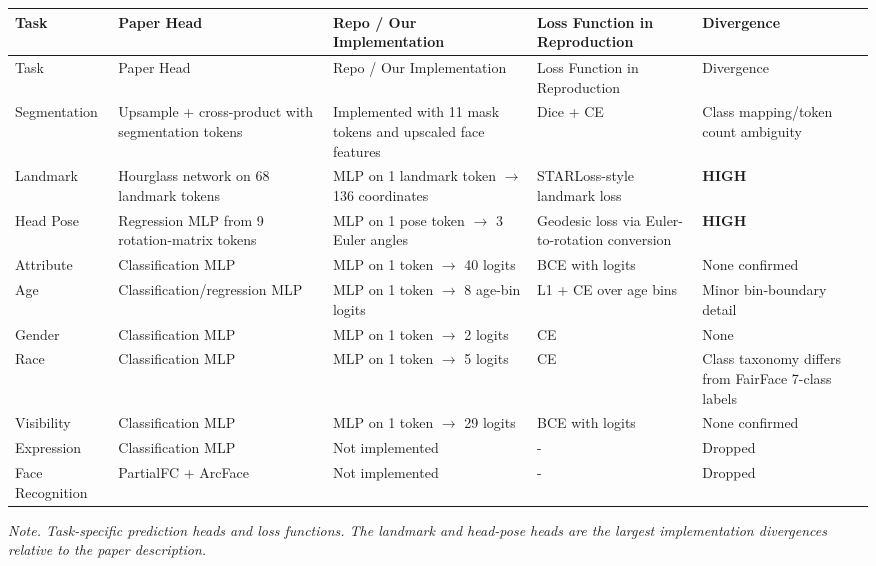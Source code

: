 \documentclass[11pt]{article}
\begin{document}
\begingroup
\scriptsize
\setlength{\tabcolsep}{3pt}
\begin{longtable}{@{}>{\RaggedRight\arraybackslash}p{}>{\RaggedRight\arraybackslash}p{}>{\RaggedRight\arraybackslash}p{}>{\RaggedRight\arraybackslash}p{}>{\RaggedRight\arraybackslash}p{}@{}}
\toprule
Task & Paper Head & Repo / Our Implementation & Loss Function in Reproduction & Divergence \\
\midrule
\endfirsthead
\toprule
Task & Paper Head & Repo / Our Implementation & Loss Function in Reproduction & Divergence \\
\midrule
\endhead
Segmentation & Upsample + cross-product with segmentation tokens & Implemented with 11 mask tokens and upscaled face features & Dice + CE & Class mapping/token count ambiguity \\
Landmark & Hourglass network on 68 landmark tokens & MLP on 1 landmark token $\rightarrow$ 136 coordinates & STARLoss-style landmark loss & \textbf{HIGH} \\
Head Pose & Regression MLP from 9 rotation-matrix tokens & MLP on 1 pose token $\rightarrow$ 3 Euler angles & Geodesic loss via Euler-to-rotation conversion & \textbf{HIGH} \\
Attribute & Classification MLP & MLP on 1 token $\rightarrow$ 40 logits & BCE with logits & None confirmed \\
Age & Classification/regression MLP & MLP on 1 token $\rightarrow$ 8 age-bin logits & L1 + CE over age bins & Minor bin-boundary detail \\
Gender & Classification MLP & MLP on 1 token $\rightarrow$ 2 logits & CE & None \\
Race & Classification MLP & MLP on 1 token $\rightarrow$ 5 logits & CE & Class taxonomy differs from FairFace 7-class labels \\
Visibility & Classification MLP & MLP on 1 token $\rightarrow$ 29 logits & BCE with logits & None confirmed \\
Expression & Classification MLP & Not implemented & - & Dropped \\
Face Recognition & PartialFC + ArcFace & Not implemented & - & Dropped \\
\bottomrule
\end{longtable}
\endgroup


\emph{Note. Task-specific prediction heads and loss functions. The landmark and head-pose heads are the largest implementation divergences relative to the paper description.}
\end{document}
